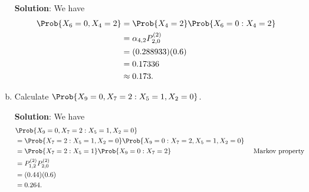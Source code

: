 \begin{Example}
\begin{enumerate}[(a)]
              \textbf{Solution}: We have
              \begin{align*}
                  \Prob{X_6=0,X_4=2}
                   & =\Prob{X_4=2}\Prob{X_6=0\given X_4=2} \\
                   & =\alpha_{4,2}P_{2,0}^{(2)}            \\
                   & =(0.288933)(0.6)                      \\
                   & =0.17336                              \\
                   & \approx 0.173.
              \end{align*}
        \item Calculate $ \Prob{X_9=0,X_7=2\given X_5=1,X_2=0} $.

              \textbf{Solution}: We have
              \begin{align*}
                   & \Prob{X_9=0,X_7=2\given X_5=1,X_2=0}                                                             \\
                   & =\Prob{X_7=2\given X_5=1,X_2=0}\Prob{X_9=0\given X_7=2,X_5=1,X_2=0}                              \\
                   & =\Prob{X_7=2\given X_5=1}\Prob{X_9=0\given X_7=2}                   &  & \text{ Markov property} \\
                   & =P_{1,2}^{(2)}P_{2,0}^{(2)}                                                                      \\
                   & =(0.44)(0.6)                                                                                     \\
                   & =0.264.
              \end{align*}
    \end{enumerate}
\end{Example}
